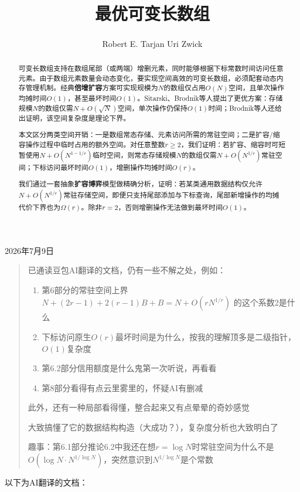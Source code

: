 \documentclass[11pt,a4paper]{article}
\newcommand{\authortarjan}{Robert E. Tarjan \textsuperscript{\dag}}
\newcommand{\authorzwick}{Uri Zwick \textsuperscript{\ddag}}
\begin{document}
\noindent 2026年7月9日
\begin{quote}
已通读豆包AI翻译的文档，仍有一些不解之处，例如：
\begin{enumerate}
    \item 第6部分的常驻空间上界 $N+(2r-1)+2(r-1)B+B=N+O(rN^{1/r})$ 的这个系数2是什么
    \item 下标访问原生$O(r)$最坏时间是为什么，按我的理解顶多是二级指针，$O(1)$复杂度
    \item 第6.2部分信用额度是什么鬼第一次听说，再看看
    \item 第8部分看得有点云里雾里的，怀疑AI有删减
\end{enumerate}
此外，还有一种局部看得懂，整合起来又有点晕晕的奇妙感觉

大致搞懂了它的数据结构构造（大成功？），复杂度分析也大致明白了

趣事：第6.1部分推论6.2中我还在想$r=\log N$时常驻空间为什么不是$O(\log N\cdot N^{1/\log N})$，突然意识到$N^{1/\log N}$是个常数
\end{quote}
以下为AI翻译的文档：
\vspace{1em}

\title{最优可变长数组}
\author{\authortarjan \quad \authorzwick}
\maketitle

\begin{abstract}
可变长数组支持在数组尾部（或两端）增删元素，同时能够根据下标常数时间访问任意元素。由于数组元素数量会动态变化，要实现空间高效的可变长数组，必须配套动态内存管理机制。经典\textbf{倍增扩容}方案可实现规模为$N$的数组仅占用$O(N)$空间，且单次操作均摊时间$O(1)$，甚至最坏时间$O(1)$。Sitarski、Brodnik等人提出了更优方案：存储规模$N$的数组仅需$N+O(\sqrt{N})$空间，单次操作仍保持$O(1)$时间；Brodnik等人还给出证明，该空间复杂度是理论下界。

本文区分两类空间开销：一是数组常态存储、元素访问所需的常驻空间；二是扩容/缩容操作过程中临时占用的额外空间。对任意整数$r\ge2$，我们证明：若扩容、缩容时可短暂使用$N+O(N^{1-1/r})$临时空间，则常态存储规模$N$的数组仅需$N+O(N^{1/r})$常驻空间；下标访问最坏时间$O(1)$，增删操作均摊时间$O(r)$。

我们通过一套抽象\textbf{扩容博弈}模型做精确分析，证明：若某类通用数据结构仅允许$N+O(N^{1/r})$常驻存储空间，即便只支持尾部添加与下标查询，尾部新增操作的均摊代价下界也为$\Omega(r)$。除非$r=2$，否则增删操作无法做到最坏时间$O(1)$。
\end{abstract}
\end{document}

